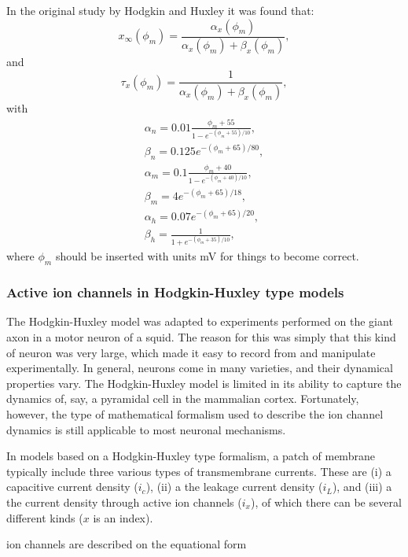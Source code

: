 In the original study by Hodgkin and Huxley it was found that:
\begin{equation}
x_{\infty}(\phi_m) = \frac{\alpha_x(\phi_m)}{\alpha_x(\phi_m) + \beta_x(\phi_m)}, 
\label{eq:xinfly}
\end{equation}
and
\begin{equation}
\tau_{x}(\phi_m) = \frac{1}{\alpha_x(\phi_m) + \beta_x(\phi_m)}, 
\label{eq:taux}
\end{equation}
with
\begin{eqnarray}
\alpha_n = 0.01 \frac{\phi_m+55}{1-e^{-(\phi_m+55)/10}}, \\
\beta_n = 0.125 e^{-(\phi_m+65)/80}, \\
\alpha_m = 0.1 \frac{\phi_m+40}{1-e^{-(\phi_m+40)/10}}, \\
\beta_m = 4 e^{-(\phi_m+65)/18}, \\
\alpha_h = 0.07 e^{-(\phi_m+65)/20}, \\
\beta_h = \frac{1}{1+e^{-(\phi_m+35)/10}}, 
\end{eqnarray}
where $\phi_m$ should be inserted with units mV for things to become correct. 


\subsubsection{Active ion channels in Hodgkin-Huxley type models}
The Hodgkin-Huxley model was adapted to experiments performed on the giant axon in a motor neuron of a squid. The reason for this was simply that this kind of neuron was very large, which made it easy to record from and manipulate experimentally. In general, neurons come in many varieties, and their dynamical properties vary. The Hodgkin-Huxley model is limited in its ability to capture the dynamics of, say, a pyramidal cell in the mammalian cortex. Fortunately, however, the type of mathematical formalism used to describe the ion channel dynamics is still applicable to most neuronal mechanisms. 

In models based on a Hodgkin-Huxley type formalism, a patch of membrane typically include three various types of transmembrane currents. These are (i) a capacitive current density ($i_c$), (ii) a the leakage current density ($i_L$), and (iii) a the current density through active ion channels ($i_x$), of which there can be several different kinds ($x$ is an index). 





ion channels are described on the equational form

